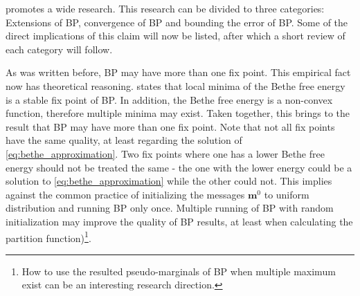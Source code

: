  promotes a wide research.
This research can be divided to three categories:
Extensions of BP, convergence of BP and bounding the error of BP.
Some of the direct implications of this claim will now be listed, after which a short review of each category will follow.

As was written before, BP may have more than one fix point.
This empirical fact now has theoretical reasoning. 
 states that local minima of the Bethe free energy is a stable fix point of BP.
In addition, the Bethe free energy is a non-convex function, therefore multiple minima may exist.
Taken together, this brings to the result that BP may have more than one fix point.
Note that not all fix points have the same quality, at least regarding the solution of \eqref{eq:bethe_approximation}.
Two fix points where one has a lower Bethe free energy should not be treated the same - the one with the lower energy could be a solution to \eqref{eq:bethe_approximation} while the other could not.
This implies against the common practice of initializing the messages $\boldsymbol{m}^0$ to uniform distribution and running BP only once.
Multiple running of BP with random initialization may improve the quality of BP results, at least when calculating the partition function)\footnote{How to use the resulted pseudo-marginals of BP when multiple maximum exist can be an interesting research direction.}.

